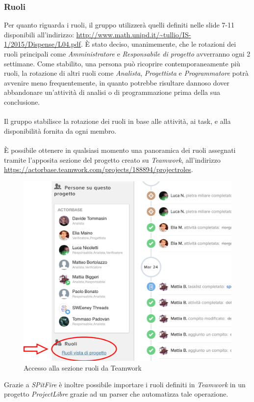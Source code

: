 \documentclass[a4paper]{article}
\begin{document}
	\subsubsection{Ruoli}
		Per quanto riguarda i ruoli, il gruppo utilizzerà quelli definiti nelle slide 7-11 disponibili all'indirizzo:
		\url{http://www.math.unipd.it/~tullio/IS-1/2015/Dispense/L04.pdf}. È stato deciso, unanimemente, che le rotazioni dei ruoli principali
		come \emph{Amministratore} e \emph{Responsabile di progetto} avverranno ogni 2 settimane. Come stabilito, una persona può ricoprire
		contemporaneamente più ruoli, la rotazione di altri ruoli come \emph{Analista}, \emph{Progettista} e \emph{Programmatore} potrà avvenire
		meno frequentemente, in quanto potrebbe risultare dannoso dover abbandonare un'attività di analisi o di programmazione prima della sua
		conclusione.
\\ \\
		Il gruppo stabilisce la rotazione dei ruoli in base alle attività, ai task, e alla disponibilità fornita da ogni membro.
\\ \\
		È possibile ottenere in qualsiasi momento una panoramica dei ruoli assegnati tramite l'apposita sezione del
		progetto creato su \emph{Teamwork}, all'indirizzo\\ \url{https://actorbase.teamwork.com/projects/188894/projectroles}. 
	\begin{figure}[H]
		\centering
		\includegraphics[scale=0.5]{ruoli.png}
		\caption{Accesso alla sezione ruoli da Teamwork}
	\end{figure}
		Grazie a \emph{SPitFire} è inoltre possibile importare i ruoli definiti in \emph{Teamwork} in un progetto \emph{ProjectLibre} grazie ad un parser che automatizza tale operazione.
\end{document}
